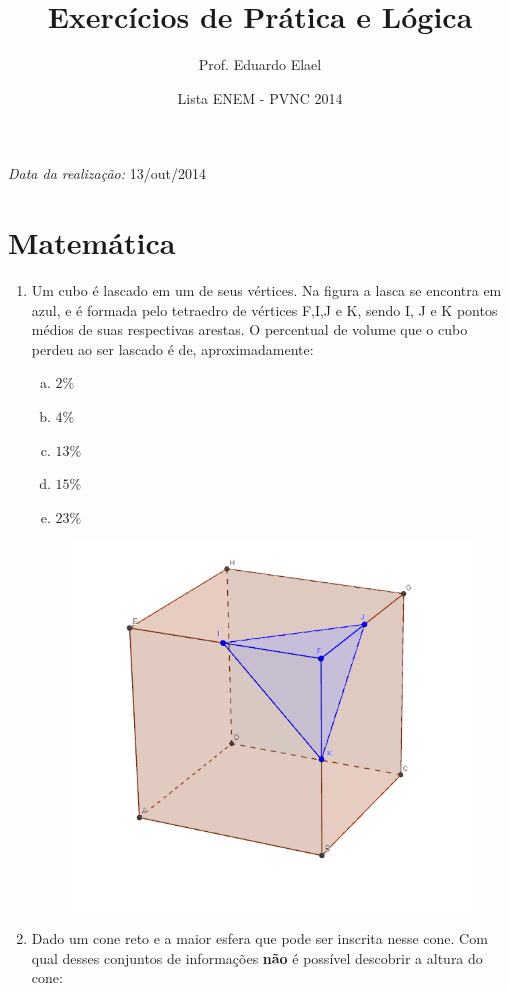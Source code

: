 \documentclass[a4paper,11pt,oneside,brazilian]{article}
\begin{document}
\title{Exercícios de Prática e Lógica}
\author{Prof. Eduardo Elael}
\date{Lista ENEM - PVNC 2014}
\maketitle


\begin{flushright}
  \emph{Data da realização:} 13/out/2014
\end{flushright}

\section{Matemática}
\begin{enumerate}[{R}1]
 
  \item Um cubo é lascado em um de seus vértices. Na figura a lasca se encontra
  em azul, e é formada pelo tetraedro de vértices F,I,J e K, sendo I, J e K
  pontos médios de suas respectivas arestas. O percentual de volume que o cubo
  perdeu ao ser lascado é de, aproximadamente:

  \nopagebreak[4]
  \begin{multicols}{2}
  \begin{enumerate}[a)]
    \item $2\%$
    \item $4\%$
    \item $13\%$
    \item $15\%$
    \item $23\%$
  \end{enumerate}
  
	\begin{figure}[H]
	 \centering
	 \includegraphics[width=1\columnwidth]{cube.png}
	 \label{fig:cube}
	\end{figure}
  \end{multicols}
  \pagebreak[4]
  \item Dado um cone reto e a maior esfera que pode ser inscrita nesse cone. Com
  qual desses conjuntos de informações \textbf{não} é possível descobrir a altura do cone:
  


\end{enumerate}
\end{document}
